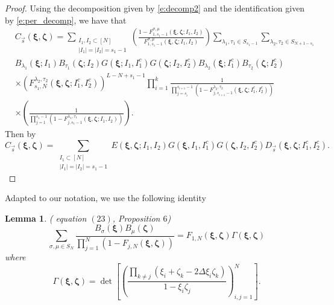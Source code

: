 \documentclass[a4paper,11pt]{article}
\newtheorem{lemma}[theorem]{Lemma}
\theoremstyle{definition}
\begin{document}
\begin{proof}Using the decomposition given by \eqref{e:decomp2} and the identification given by \eqref{e:per_decomp}, we have that
\begin{equation}
\begin{split}
    &C_{\vec{s}}(\boldsymbol{\xi},\boldsymbol{\zeta}) =\sum_{\substack{I_1,I_2 \subset [N]\\|I_1| = |I_2| = s_1-1}} \left(\frac{1-F_{1,s_1-1}^{\sigma,\mu}(\boldsymbol{\xi},\boldsymbol{\zeta}; I_1, I_2)}{F_{1,s_1-1}^{\sigma,\mu}(\boldsymbol{\xi},\boldsymbol{\zeta}; I_1, I_2)}\right) \sum_{\lambda_1, \tau_1 \in S_{s_1-1}}\sum_{\lambda_2, \tau_2 \in S_{N+1-s_1}}\\
    &B_{\lambda_1}(\boldsymbol{\xi};I_1)B_{\tau_1}(\boldsymbol{\zeta};I_2)G(\boldsymbol{\xi};I_1,I_1^c)G(\boldsymbol{\zeta};I_2,I_2^c)B_{\lambda_2}(\boldsymbol{\xi};I_1^c)B_{\tau_2}(\boldsymbol{\zeta};I_2^c)\\
    &\times\left(F_{s_1,N}^{\lambda_2,\tau_2}(\boldsymbol{\xi},\boldsymbol{\zeta}; I_1^c, I_2^c)\right)^{L-N+s_1-1} \prod_{i=1}^k\frac{1}{\prod_{j=s_i}^{s_{i+1}-1}\left(1-F_{j,s_{i+1}-1}^{\lambda_2,\tau_2}(\boldsymbol{\xi},\boldsymbol{\zeta}; I_1^c, I_2^c)\right)}\\
    &\times \left(\frac{1}{\prod_{j=1}^{s_{1}-1}\left(1-F_{j,s_{1}-1}^{\lambda_1,\tau_1}(\boldsymbol{\xi},\boldsymbol{\zeta};I_1, I_2)\right)} \right).
\end{split}
\end{equation}
Then by 
\begin{equation}\label{e:CsToEGGDs}
C_{\vec{s}}(\boldsymbol{\xi}, \boldsymbol{\zeta}) = \sum_{\substack{I_1 \subset [N]\\|I_1| = |I_2| = s_1-1}} E(\boldsymbol{\xi}, \boldsymbol{\zeta}; I_1, I_2) G(\boldsymbol{\xi},I_1, I_1^c)G(\boldsymbol{\zeta},I_2, I_2^c)D_{\vec{s}}(\boldsymbol{\xi}, \boldsymbol{\zeta}; I_1^c, I_2^c) .
\end{equation} 
\end{proof}


Adapted to our notation, we use the following identity 
\begin{lemma}(\cite{saenz_domain_2022} equation $(23)$, \cite{Cantini:2019zmz} Proposition $6$)\label{l:STW(23)}
\begin{equation}
    \sum_{\sigma, \mu \in S_N} \frac{B_{\sigma}(\boldsymbol{\xi}) B_{\mu}(\boldsymbol{\zeta})}{\prod_{j=1}^N \left(1 - F_{j, N}(\boldsymbol{\xi}, \boldsymbol{\zeta})\right)} = F_{1, N}(\boldsymbol{\xi}, \boldsymbol{\zeta}) \Gamma(\boldsymbol{\xi}, \boldsymbol{\zeta})
\end{equation}
where
\begin{equation}
    \Gamma(\boldsymbol{\xi},\boldsymbol{\zeta}) =\det \left[\left( \frac{\prod_{k \neq j}(\xi_i + \zeta_k - 2 \Delta \xi_i \zeta_k)}{1-\xi_i \zeta_j}\right)_{i, j=1}^N \right].
\end{equation}
\end{lemma}
\end{document}
